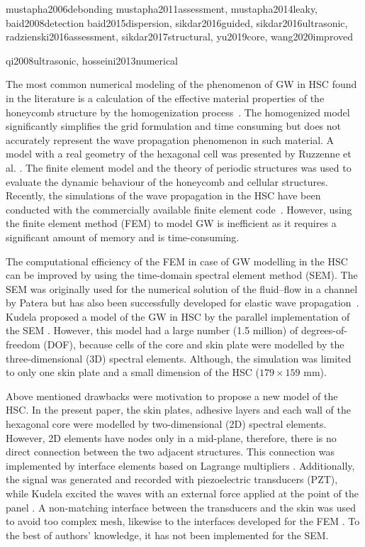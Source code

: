 \documentclass[a4paper,fleqn]{cas-sc}
\begin{document}
mustapha2006debonding
mustapha2011assessment,
mustapha2014leaky,
baid2008detection
baid2015dispersion,
sikdar2016guided,
sikdar2016ultrasonic,
radzienski2016assessment,
sikdar2017structural,
yu2019core,
wang2020improved


qi2008ultrasonic,
hosseini2013numerical


The most common numerical modeling of the phenomenon of GW in HSC found in the literature is a calculation of the effective material properties of the honeycomb structure by the homogenization process~\cite{shi1995derivation, qi2008ultrasonic, mustapha2014leaky, baid2015dispersion, sikdar2016guided}.
The homogenized model significantly simplifies the grid formulation and time consuming but does not accurately represent the wave propagation phenomenon in such material. 
A model with a real geometry of the hexagonal cell was presented by Ruzzenne et al. \cite{ruzzene2003wave}.
The finite element model and the theory of periodic structures was used to evaluate the dynamic behaviour of the honeycomb and cellular structures.
Recently, the simulations of the wave propagation in the HSC have been conducted with the commercially available finite element code~\cite{song2009guided, hosseini2013numerical, tian2015wavenumber, zhao2018wave}.
However, using the finite element method (FEM) to model GW is inefficient as it requires a significant amount of memory and is time-consuming.

The computational efficiency of the FEM in case of GW modelling in the HSC can be improved by using the time-domain spectral element method (SEM).
The SEM was originally used for the numerical solution of the fluid--flow in a channel by Patera \cite{patera1984spectral} but has also been successfully developed for elastic wave propagation~\cite{ostachowicz2011guided}.
Kudela proposed a model of the GW in HSC by the parallel implementation of the SEM \cite{kudela2016parallel}.
However, this model had a large number (1.5 million) of degrees-of-freedom (DOF), because cells of the core and skin plate were modelled by the three-dimensional (3D) spectral elements.
Although, the simulation was limited to only one skin plate and a small dimension of the HSC (\(179 \times 159 \) mm).

Above mentioned drawbacks were motivation to propose a new model of the HSC. In the present paper, the skin plates, adhesive layers and each wall of the hexagonal core were modelled by two-dimensional (2D) spectral elements.
However, 2D elements have nodes only in a mid-plane, therefore, there is no direct connection between the two adjacent structures.
This connection was implemented by interface elements based on Lagrange multipliers \cite{ashwin2014formulation, fiborek20192d}.
Additionally, the signal was generated and recorded with piezoelectric transducers (PZT), while Kudela excited the waves with an external force applied at the point of the panel \cite{kudela2016parallel}.
A non-matching interface between the transducers and the skin was used to avoid too complex mesh, likewise to the interfaces developed for the FEM \cite{flemisch2000elasto, flemisch2012non}. To the best of authors’
knowledge, it has not been implemented for the SEM.
\end{document}
